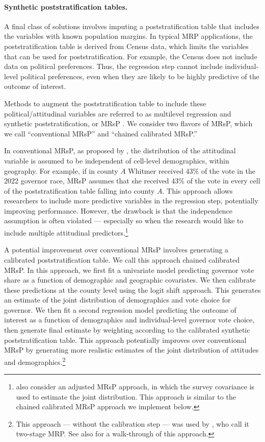 \paragraph{Synthetic poststratification tables.}
A final class of solutions involves imputing a poststratification table that includes the variables with known population margins. 
In typical MRP applications, the poststratification table is derived from Census data, which limits the variables that can be used for poststratification. 
For example, the Census does not include data on political preferences. 
Thus, the regression step cannot include individual-level political preferences, even when they are likely to be highly predictive of the outcome of interest. 

Methods to augment the poststratification table to include these political/attitudinal variables are referred to as multilevel regression and synthetic poststratification, or MRsP \citep{LW:2017}. 
We consider two flavors of MRsP, which we call ``conventional MRsP'' and ``chained calibrated MRsP.''

In conventional MRsP, as proposed by \citet{LW:2017}, the distribution of the attitudinal variable is assumed to be independent of cell-level demographics, within geography. For example, if in county $A$ Whitmer received 43\% of the  vote in the 2022 governor race, MRsP assumes that she received 43\% of the vote in every cell of the poststratification table falling into county $A$. 
This approach allows researchers to include more predictive variables in the regression step, potentially improving performance. 
However, the drawback is that the independence assumption is often violated --- especially so when the research would like to include multiple attitudinal predictors.\footnote{\citet{LW:2017} also consider an adjusted MRsP approach, in which the survey covariance is used to estimate the joint distribution. This approach is similar to the chained calibrated MRsP approach we implement below.}

A potential improvement over conventional MRsP involves generating a calibrated poststratification table.
We call this approach chained calibrated MRsP. 
In this approach, we first fit a univariate model predicting governor vote share as a function of demographic and geographic covariates.
We then calibrate these predictions at the county level using the logit shift approach. 
This generates an estimate of the joint distribution of demographics and vote choice for governor. 
We then fit a second regression model predicting the outcome of interest as a function of demographics and individual-level governor vote choice, then generate final estimate by weighting according to the calibrated synthetic poststratification table.
This approach potentially improves over conventional MRsP by generating more realistic estimates of the joint distribution of attitudes and demographics.\footnote{This approach --- without the calibration step --- was used by \citet{Kastellec2015}, who call it two-stage MRP. See also \citet{LopezMartinEtAl2022} for a walk-through of this approach.}

